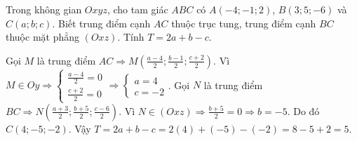 \begin{baitap}
	Trong không gian $Oxyz$, cho tam giác $ABC$ có $A(-4; -1; 2)$, $B(3; 5; -6)$ và $C(a; b; c)$. Biết trung điểm cạnh $AC$ thuộc trục tung, trung điểm cạnh $BC$ thuộc mặt phẳng $(Oxz)$. Tính $T = 2a + b - c$.
	\begin{traloi}
		Gọi $M$ là trung điểm $AC \Rightarrow M\left(\frac{a-4}{2}; \frac{b-1}{2}; \frac{c+2}{2}\right)$.
		Vì $M \in Oy \Rightarrow \begin{cases} \frac{a-4}{2} = 0 \\ \frac{c+2}{2} = 0 \end{cases} \Rightarrow \begin{cases} a = 4 \\ c = -2 \end{cases}$.
		Gọi $N$ là trung điểm $BC \Rightarrow N\left(\frac{a+3}{2}; \frac{b+5}{2}; \frac{c-6}{2}\right)$.
		Vì $N \in (Oxz) \Rightarrow \frac{b+5}{2} = 0 \Rightarrow b = -5$.
		Do đó $C(4; -5; -2)$.
		Vậy $T = 2a + b - c = 2(4) + (-5) - (-2) = 8 - 5 + 2 = 5$.
	\end{traloi}
\end{baitap}

